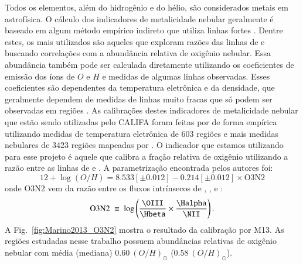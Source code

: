 Todos os elementos, além do hidrogênio e do hélio, são considerados metais em astrofísica. O cálculo
dos indicadores de metalicidade nebular geralmente é baseado em algum método empírico indireto que
utiliza linhas fortes \citep[\emph{strong-line methods}; ][]{Pagel.etal.1979a}. Dentre estes, os
mais utilizados são aqueles que exploram razões das linhas de \OIII e \NII buscando correlações com
a abundância relativa de oxigênio nebular. Essa abundância também pode ser calculada diretamente
utilizando os coeficientes de emissão dos íons de $O$ e $H$ e medidas de algumas linhas observadas.
Esses coeficientes são dependentes da temperatura eletrônica e da densidade, que geralmente
dependem de medidas de linhas muito fracas que só podem ser observadas em regiões \Hii. As
calibrações destes indicadores de metalicidade nebular que estão sendo utilizadas pelo CALIFA foram
feitas por \citet[][M13 daqui em diante]{Marino.etal.2013a} de forma empírica utilizando medidas de
temperatura eletrônica de 603 regiões \Hii e mais medidas nebulares de 3423 regiões \Hii mapeadas
por \citet{Sanchez.etal.2013a}. O indicador que estamos utilizando para esse projeto é aquele que
calibra a fração relativa de oxigênio utilizando a razão entre as linhas de \oIII e \nII. A
parametrização encontrada pelos autores foi:
\begin{equation}
	12 + \log (O/H) = 8.533[\pm0.012] - 0.214[\pm0.012]\times \textrm{O3N2}
\end{equation}
\noindent onde O3N2 vem da razão entre os fluxos intrínsecos de \oIII, \Hbeta, \nII e \Halpha:
\begin{equation}
	\textrm{O3N2}\ \equiv\ \log \left(\frac{\OIII}{\Hbeta} \times \frac{\Halpha}{\NII}\right).
\end{equation}
A Fig.\ \ref{fig:Marino2013_O3N2} mostra o resultado da calibração por M13. As regiões estudadas
nesse trabalho possuem abundâncias relativas de oxigênio nebular com média (mediana) $0.60\
(O/H)_\odot$ ($0.58\ (O/H)_\odot$).

